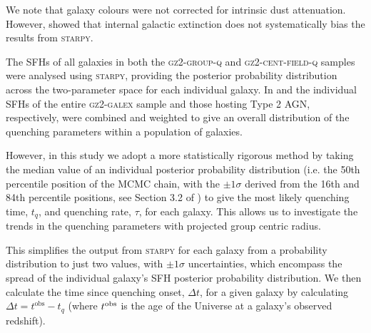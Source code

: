 \documentclass[useAMS,usenatbib]{mn2e}
\begin{document}
We note that galaxy colours were not corrected for intrinsic dust attenuation. However,  \citet[][see Section~2.2]{smethurst16} showed that internal galactic extinction does not systematically bias the results from \textsc{starpy}. 

The SFHs of all galaxies in both the \textsc{gz2-group-q} and \textsc{gz2-cent-field-q} samples were analysed using \textsc{starpy}, providing the posterior probability distribution across the two-parameter space for each individual galaxy. In \cite{smethurst15} and \cite{smethurst16} the individual SFHs of the entire \textsc{gz2-galex} sample and those hosting Type 2 AGN, respectively, were combined and weighted to give an overall distribution of the quenching parameters within a population of galaxies. 

However, in this study we adopt a more statistically rigorous method by taking the median value of an individual posterior probability distribution (i.e. the 50th percentile position of the MCMC chain, with the $\pm1\sigma$ derived from the 16th and 84th percentile positions, see Section 3.2 of \citealt{smethurst15}) to give the most likely quenching time, $t_{q}$, and quenching rate, $\tau$, for each galaxy. This allows us to investigate the trends in the quenching parameters with projected group centric radius. 

This simplifies the output from \textsc{starpy} for each galaxy from a probability distribution to just two values, with $\pm1\sigma$ uncertainties, which encompass the spread of the individual galaxy's SFH posterior probability distribution. We then calculate the time since quenching onset, $\Delta t$, for a given galaxy by calculating {\bf $\Delta t = t^\mathrm{obs} - t_{q}$} (where $t^{\rm{obs}}$ is the age of the Universe at a galaxy's observed redshift). 
\end{document}
